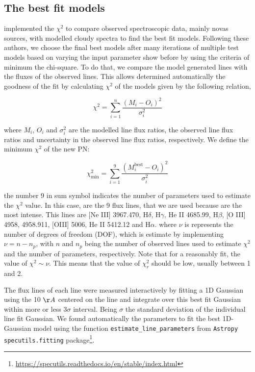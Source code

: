 \documentclass[fleqn,usenatbib]{mnras}
\begin{document}
{\subsection{The best fit models}
\label{sec:best-fit}

\citet{Helton:2010, Mondal:2018, Pavana:2019, Mondal:2020, Pandey:2022a, Pandey:2022b}
implemented the $\chi^2$  to compare observed spectroscopic data,
mainly novas sources, with modelled {\sc cloudy} spectra to find the best
fit models. Following these authors, we choose the final best models
after many iterations of multiple test models based on varying the input parameter
show before by using the criteria of minimum the chi-square. To do that, we compare the model generated lines with the fluxes of the observed lines.
This allows determined automatically the goodness of the fit by
calculating $\chi^{2}$ of the models given by the following relation,

\begin{equation}
  \chi^{2} = \sum^{n}_{i = 1} \frac{(M_i - O_i)^2}{\sigma^{2}_i}
  \label{eq:chi}
\end{equation}

where $M_i$, $O_i$ and $\sigma^{2}_i$ are the modelled line flux ratios, the observed line flux
ratios and uncertainty in the observed line flux ratios, respectively. We define the minimum
$\chi^{2}$ of the new PN:

\begin{equation}
   \chi^{2}_{\text{min}} = \sum^{9}_{i = 1} \frac{(M^{\text{best}}_i - O_i)^2}{\sigma^{2}_i}
  \label{eq:chi-red}
\end{equation}

the number 9 in sum symbol indicates the number of parameters used to estimate the  $\chi^{2}$ value.
In this case, are the 9 flux lines, that we are used because are the most intense.
This lines are [Ne III] 3967.470, H$\delta$, H$\gamma$, He II 4685.99, H$\beta$, [O III] 4958, 4958.911,
[OIII] 5006, He II 5412.12 and H{$\alpha$}.
where $\nu$ is represents the number of degrees of freedom (DOF), which is estimate
by implementing $\nu = n - n_p$, with $n$ and $n_p$ being the number of observed lines
used to estimate $\chi^{2}$ and the number of parameters, respectively. Note that for a reasonably
fit, the value of $\chi^{2} \sim \nu$. This means that the value of $\chi^{2}_r$ should be low,
usually between 1 and 2. 

The flux lines of each line were measured  interactively by fitting a 1D Gaussian using the 10 $\AA$
centered on the line and integrate over this best fit Gaussian within more or less 3$\sigma$ interval. Being $\sigma$ the
standard deviation of the individual line fit Gaussian. We found automatically the
parameters to fit the best 1D-Gaussian model using the function \texttt{estimate\_line\_parameters} from \texttt{Astropy specutils.fitting}
package\footnote{\url{https://specutils.readthedocs.io/en/stable/index.html}}.

}
\end{document}
